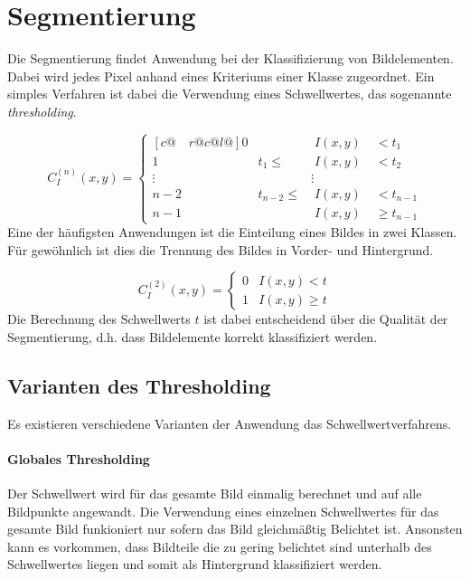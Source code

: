 \section*{Segmentierung}
\writtenby{\dcauthornameewie}%
Die Segmentierung findet Anwendung bei der Klassifizierung von Bildelementen.
Dabei wird jedes Pixel anhand eines Kriteriums einer Klasse zugeordnet.
Ein simples Verfahren ist dabei die Verwendung eines Schwellwertes, das sogenannte \emph{thresholding}.

  \[ C_I^{(n)}(x,y) = \begin{cases}[c@{\quad}r@{}c@{}l@{}]
       0      &              & \;I(x,y) & \;<    t_1     \\
       1      & t_1     \leq & \;I(x,y) & \;<    t_2     \\
       \vdots &              &   \vdots &                \\
       n-2    & t_{n-2} \leq & \;I(x,y) & \;<    t_{n-1} \\
       n-1    &              & \;I(x,y) & \;\geq t_{n-1}
     \end{cases} \]
%
Eine der häufigsten Anwendungen ist die Einteilung eines Bildes in zwei Klassen.
Für gewöhnlich ist dies die Trennung des Bildes in Vorder- und Hintergrund.

  \[ C_I^{(2)}(x,y) = \begin{cases}
       0 & I(x,y) <    t \\
       1 & I(x,y) \geq t
     \end{cases} \]
%
Die Berechnung des Schwellwerts $t$ ist dabei entscheidend über die Qualität der Segmentierung, d.h. dass Bildelemente korrekt klassifiziert werden.

\subsection*{Varianten des Thresholding}
Es existieren verschiedene Varianten der Anwendung das Schwellwertverfahrens.


\paragraph{Globales Thresholding}
Der Schwellwert wird für das gesamte Bild einmalig berechnet und auf alle Bildpunkte angewandt.
Die Verwendung eines einzelnen Schwellwertes für das gesamte Bild funkioniert nur sofern das Bild gleichmäßtig Belichtet ist.
Ansonsten kann es vorkommen, dass Bildteile die zu gering belichtet sind unterhalb des Schwellwertes liegen und somit als Hintergrund klassifiziert werden.

